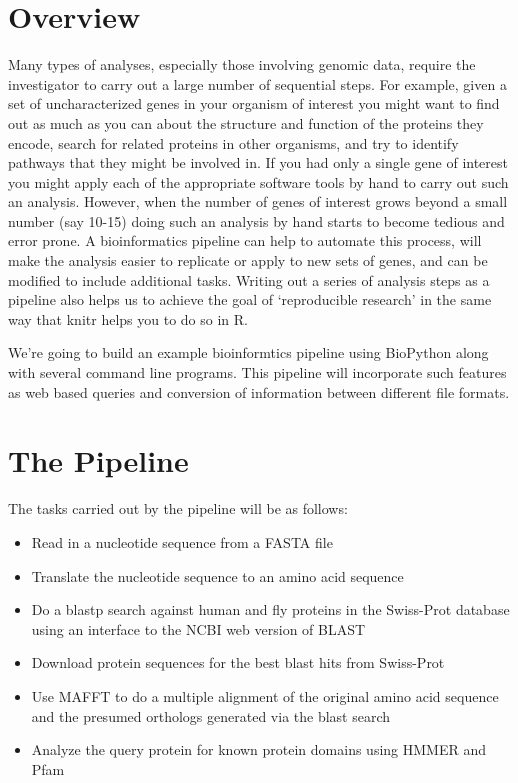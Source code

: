 
\section{Overview}

Many types of analyses, especially those involving genomic data, require the investigator to carry out a large number of sequential steps. For example, given a set of uncharacterized genes in your organism of interest you might want to find out as much as you can about the structure and function of the proteins they encode, search for related proteins in other organisms, and try to identify pathways that they might be involved in. If you had only a single gene of interest you might apply each of the appropriate software tools by hand to carry out such an analysis. However, when the number of genes of interest grows beyond a small number (say 10-15) doing such an analysis by hand starts to become tedious and error prone.  A bioinformatics pipeline can help to automate this process, will make the analysis easier to replicate or apply to new sets of genes, and can be modified to include additional tasks.  Writing out a series of analysis steps as a pipeline also helps us to achieve the goal of `reproducible research' in the same way that knitr helps you to do so in R.

We're going to build an example bioinformtics pipeline using BioPython along with several command line programs.  This pipeline will incorporate such features as web based queries and conversion of information between different file formats.

\section{The Pipeline}


The tasks carried out by the pipeline will be as follows:

\begin{itemize}

\item Read in a nucleotide sequence from a FASTA file
\item Translate the nucleotide sequence to an amino acid sequence
\item Do a blastp search against human and fly proteins in the Swiss-Prot database using an interface to the NCBI web version of BLAST
\item Download protein sequences for the best blast hits from Swiss-Prot
\item Use MAFFT to do a multiple alignment of the original amino acid sequence and the presumed orthologs generated via the blast search
\item Analyze the query protein for known protein domains using HMMER and Pfam

\end{itemize}



